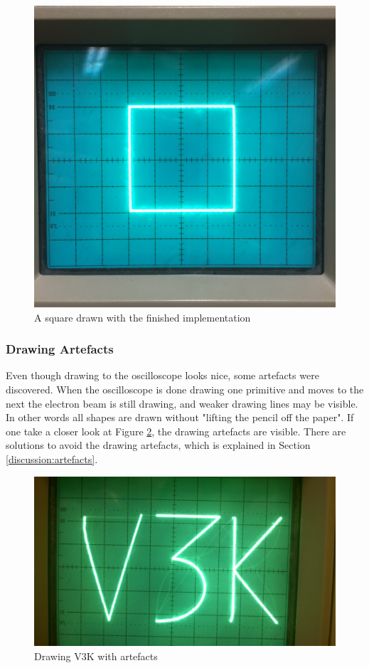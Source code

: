 \begin{figure}[h!]
	    \includegraphics[width=\linewidth]{images/square}
	    \caption{A square drawn with the finished implementation}
	    \label{fig:square}
\end{figure}


\subsubsection{Drawing Artefacts}
\label{results:artefacts}
Even though drawing to the oscilloscope looks nice, some artefacts were discovered.
When the oscilloscope is done drawing one primitive and moves to the next the electron beam is still drawing,
and weaker drawing lines may be visible.
In other words all shapes are drawn without "lifting the pencil off the paper".
If one take a closer look at Figure \ref{fig:artefact}, the drawing artefacts are visible.
There are solutions to avoid the drawing artefacts, which is explained in Section \ref{discussion:artefacts}.

\begin{figure}[h!]
	    \includegraphics[width=\linewidth]{images/artefacts.jpg}
	    \caption{Drawing V3K with artefacts}
	    \label{fig:artefact}
\end{figure}

